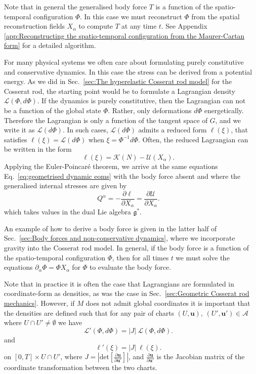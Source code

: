 Note that in general the generalised body force $T$ is a function of the spatio-temporal configuration $\Phi$. In this case we must reconstruct $\Phi$ from the spatial reconstruction fields $X_\alpha$ to compute $T$ at any time $t$. See Appendix \ref{app:Reconstructing the spatio-temporal configuration from the Maurer-Cartan form} for a detailed algorithm.

For many physical systems we often care about formulating purely constitutive and conservative dynamics. In this case the stress can be derived from a potential energy. As we did in Sec.~\ref{sec:The hyperelastic Cosserat rod model} for the Cosserat rod, the starting point would be to formulate a Lagrangian density $\mathcal{L}(\Phi, d \Phi)$. If the dynamics is purely constitutive, then the Lagrangian can not be a function of the global state $\Phi$. Rather, only deformations $d \Phi$ energetically. Therefore the Lagrangian is only a function of the tangent space of $G$, and we write it as $\mathcal{L}(d \Phi)$. In such cases, $\mathcal{L}(d \Phi)$ admits a reduced form $\ell(\xi)$, that satisfies $\ell(\xi) = \mathcal{L}(d \Phi)$ when $\xi = \Phi^{-1} d \Phi$. Often, the reduced Lagrangian can be written in the form
\begin{equation}
\ell(\xi) = \mathcal{K}(N) - \mathcal{U}(X_\alpha).
\end{equation}
Applying the Euler-Poincaré theorem, we arrive at the same equations Eq.~\ref{eq:geometrised dynamic eoms} with the body force absent and where the generalised internal stresses are given by
\begin{equation}
Q^\alpha = - \frac{\partial \ell }{\partial X_\alpha} = \frac{\partial \mathcal{U}}{\partial X_\alpha}.
\end{equation}
which takes values in the dual Lie algebra $\mathfrak{g}^*$.

An example of how to derive a body force is given in the latter half of Sec.~\ref{sec:Body forces and non-conservative dynamics}, where we incorporate gravity into the Cosserat rod model. In general, if the body force is a function of the spatio-temporal configuration $\Phi$, then for all times $t$ we must solve the equations $\partial_\alpha \Phi = \Phi X_\alpha$ for $\Phi$ to evaluate the body force.

Note that in practice it is often the case that Lagrangians are formulated in coordinate-form as densities, as was the case in Sec.~\ref{sec:Geometric Cosserat rod mechanics}. However, if $M$ does not admit global coordinates it is important that the densities are defined such that for any pair of charts $(U, \mathbf{u}),\ (U', \mathbf{u}') \in \mathcal{A}$ where $U \cap U' \neq \emptyset$ we have
\begin{equation} 
\mathcal{L}'(\Phi, d \Phi) = |J|\ \mathcal{L}(\Phi, d \Phi).
\end{equation}
and
\begin{equation} 
\ell'(\xi) = |J|\ \ell(\xi).
\end{equation}
on $[0,T] \times U \cap U'$, where $J = \left| \text{det} \left[ \frac{\partial \mathbf{u} }{ \partial \mathbf{u}' } \right] \right|$, and $\frac{\partial \mathbf{u}}{ \partial \mathbf{u}' }$ is the Jacobian matrix of the coordinate transformation between the two charts.

